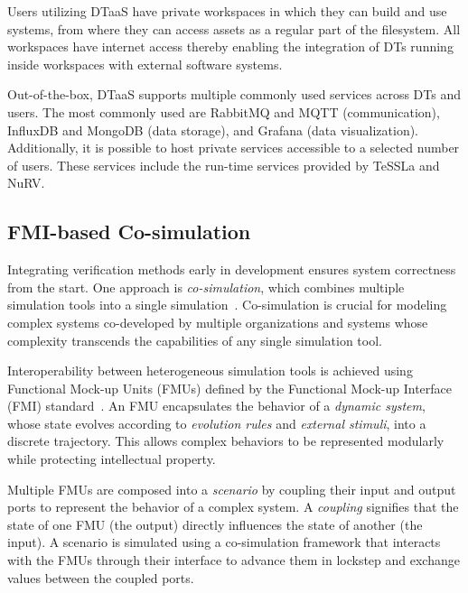 
Users utilizing DTaaS have private workspaces in which they can build and use systems, from where they can access assets as a regular part of the filesystem.
All workspaces have internet access thereby enabling the integration of DTs running inside workspaces with external software systems.

Out-of-the-box, DTaaS supports multiple commonly used services across DTs and users.
The most commonly used are RabbitMQ and MQTT (communication), InfluxDB and MongoDB (data storage), and Grafana (data visualization).
Additionally, it is possible to host private services accessible to a selected number of users.
These services include the run-time services provided by TeSSLa and NuRV.

\subsection{FMI-based Co-simulation}
\label{sc:fmi}
Integrating verification methods early in development ensures system correctness from the start.
One approach is \textit{co-simulation}, which combines multiple simulation tools into a single simulation~\cite{Gomes2018,Kubler2000}.
Co-simulation is crucial for modeling complex systems co-developed by multiple organizations and systems whose complexity transcends the capabilities of any single simulation tool.

Interoperability between heterogeneous simulation tools is achieved using Functional Mock-up Units (FMUs) defined by the Functional Mock-up Interface (FMI) standard~\cite{FMI2014}.
An FMU encapsulates the behavior of a \emph{dynamic system}, whose state evolves according to \emph{evolution rules} and \emph{external stimuli}, into a discrete trajectory.
This allows complex behaviors to be represented modularly while protecting intellectual property.

Multiple FMUs are composed into a \emph{scenario} by coupling their input and output ports to represent the behavior of a complex system.
A \emph{coupling} signifies that the state of one FMU (the output) directly influences the state of another (the input).
A scenario is simulated using a co-simulation framework that interacts with the FMUs through their interface to advance them in lockstep and exchange values between the coupled ports.
